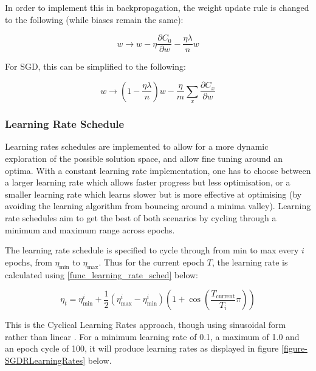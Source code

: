 \documentclass[a4paper,11pt,oneside]{article}
\theoremstyle{plain}
\theoremstyle{definition}
\begin{document}
In order to implement this in backpropagation, the weight update rule is changed to the following (while biases remain the same):

\begin{equation}\label{func_l2_weight_update}
w \rightarrow w-\eta \frac{\partial C_{0}}{\partial w}-\frac{\eta \lambda}{n} w
\end{equation}

For SGD, this can be simplified to the following: 

\begin{equation}\label{func_sgd_l2}
w \rightarrow\left(1-\frac{\eta \lambda}{n}\right) w-\frac{\eta}{m} \sum_{x} \frac{\partial C_{x}}{\partial w}
\end{equation}


\subsubsection{Learning Rate Schedule}\label{imp_learning_rate_schedule}

Learning rates schedules are implemented to allow for a more dynamic exploration of the possible solution space, and allow fine tuning around an optima. With a constant learning rate implementation, one has to choose between a larger learning rate which allows faster progress but less optimisation, or a smaller learning rate which learns slower but is more effective at optimising (by avoiding the learning algorithm from bouncing around a minima valley). Learning rate schedules aim to get the best of both scenarios by cycling through a minimum and maximum range across epochs.\newline

The learning rate schedule is specified to cycle through from min to max every $i$ epochs, from $\eta_{\min}$ to $\eta_{\max}$. Thus for the current epoch $T$, the learning rate is calculated using \ref{func_learning_rate_sched} below:

\begin{equation}\label{func_learning_rate_sched}
\eta_{t}=\eta_{\min }^{i}+\frac{1}{2}\left(\eta_{\max }^{i}-\eta_{\min }^{i}\right)\left(1+\cos \left(\frac{T_{\text {current}}}{T_{i}} \pi\right)\right)
\end{equation}

This is the Cyclical Learning Rates approach, though using sinusoidal form rather than linear \cite{Smith}. For a minimum learning rate of 0.1, a maximum of 1.0 and an epoch cycle of 100, it will produce learning rates as displayed in figure \ref{figure-SGDRLearningRates} below.
\end{document}
